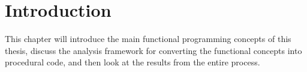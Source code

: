 \chapter{Introduction}
This chapter will introduce the main functional programming concepts of this thesis, discuss the analysis framework for converting the functional concepts into procedural code, and then look at the results from the entire process.




